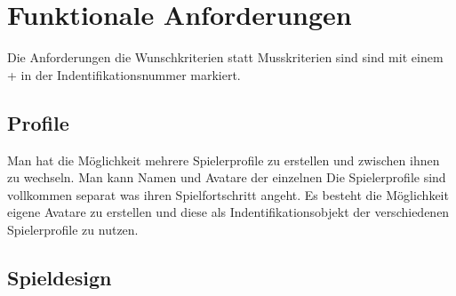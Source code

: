 \section{Funktionale Anforderungen}

Die Anforderungen die Wunschkriterien statt Musskriterien sind sind mit einem + in der Indentifikationsnummer markiert.

\subsection{Profile}

\begin{requirements}
	Man hat die Möglichkeit mehrere Spielerprofile zu erstellen und zwischen ihnen zu wechseln.
	 Man kann Namen und Avatare der einzelnen 
	Die Spielerprofile sind vollkommen separat was ihren Spielfortschritt angeht. 
	Es besteht die Möglichkeit eigene Avatare zu erstellen und diese als Indentifikationsobjekt der verschiedenen Spielerprofile zu nutzen.
\end{requirements}

\subsection{Spieldesign}

